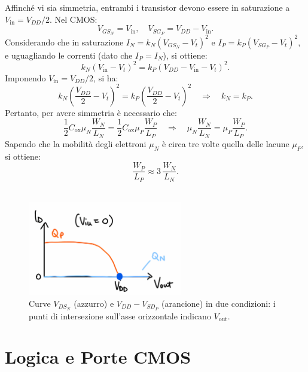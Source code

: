 Affinché vi sia simmetria, entrambi i transistor devono essere in saturazione a \(V_{\text{in}} = V_{DD}/2\). Nel CMOS:
\[
V_{GS_N} = V_{\text{in}}, \quad V_{SG_P} = V_{DD} - V_{\text{in}}.
\]
Considerando che in saturazione \(I_N = k_N (V_{GS_N}-V_t)^2\) e \(I_P = k_P (V_{SG_P}-V_t)^2\), e uguagliando le correnti (dato che \(I_P = I_N\)), si ottiene:
\[
k_N (V_{\text{in}}-V_t)^2 = k_P (V_{DD}-V_{\text{in}}-V_t)^2.
\]
Imponendo \(V_{\text{in}} = V_{DD}/2\), si ha:
\[
k_N \left(\frac{V_{DD}}{2}-V_t\right)^2 = k_P \left(\frac{V_{DD}}{2}-V_t\right)^2 \quad \Longrightarrow \quad k_N=k_P.
\]
Pertanto, per avere simmetria è necessario che:
\[
\frac{1}{2} C_{\text{ox}} \mu_N \frac{W_N}{L_N} = \frac{1}{2} C_{\text{ox}} \mu_P \frac{W_P}{L_P} \quad \Longrightarrow \quad \mu_N \frac{W_N}{L_N} = \mu_P \frac{W_P}{L_P}.
\]
Sapendo che la mobilità degli elettroni \( \mu_N \) è circa tre volte quella delle lacune \( \mu_P \), si ottiene:
\[
\frac{W_P}{L_P} \approx 3\, \frac{W_N}{L_N}.
\]
\\[2mm]
\begin{figure}[H]
    \centering
    \includegraphics[width=0.6\textwidth]{images/2.1.3.2.png}
    \caption{Curve \(V_{DS_N}\) (azzurro) e \(V_{DD}-V_{SD_P}\) (arancione) in due condizioni: i punti di intersezione sull’asse orizzontale indicano \(V_{\text{out}}\).}
    \label{fig:transcaratteristica_condizioni}
\end{figure}

\newpage
\section{Logica e Porte CMOS}

